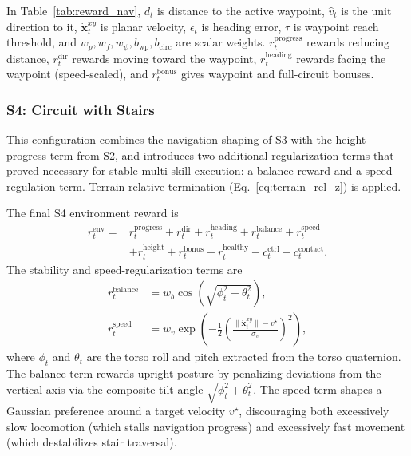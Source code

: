 \documentclass[conference]{IEEEtran}
\begin{document}
In Table~\ref{tab:reward_nav}, $d_t$ is distance to the active waypoint, $\hat{v}_t$ is the unit direction to it, $\dot{\mathbf{x}}^{xy}_t$ is planar velocity, $\epsilon_t$ is heading error, $\tau$ is waypoint reach threshold, and $w_p,w_f,w_\psi,b_{\mathrm{wp}},b_{\mathrm{circ}}$ are scalar weights. $r_t^{\mathrm{progress}}$ rewards reducing distance, $r_t^{\mathrm{dir}}$ rewards moving toward the waypoint, $r_t^{\mathrm{heading}}$ rewards facing the waypoint (speed-scaled), and $r_t^{\mathrm{bonus}}$ gives waypoint and full-circuit bonuses.



\subsubsection{S4: Circuit with Stairs}

This configuration combines the navigation shaping of S3 with the height-progress term from S2, and introduces two additional regularization terms that proved necessary for stable multi-skill execution: a balance reward and a speed-regulation term. Terrain-relative termination (Eq.~\ref{eq:terrain_rel_z}) is applied.

The final S4 environment reward is
\begin{equation}
\label{eq:s4_reward}
\begin{aligned}
r_t^{\mathrm{env}} ={}& r_t^{\mathrm{progress}} + r_t^{\mathrm{dir}} + r_t^{\mathrm{heading}} + r_t^{\mathrm{balance}} + r_t^{\mathrm{speed}} \\
& + r_t^{\mathrm{height}} + r_t^{\mathrm{bonus}} + r_t^{\mathrm{healthy}} - c_t^{\mathrm{ctrl}} - c_t^{\mathrm{contact}}.
\end{aligned}
\end{equation}
The stability and speed-regularization terms are
\begin{equation}
\label{eq:s4_balance_speed}
\begin{aligned}
r_t^{\mathrm{balance}} &= w_b \cos\!\left(\sqrt{\phi_t^2 + \theta_t^2}\right), \\
r_t^{\mathrm{speed}} &= w_v \exp\!\left(-\frac{1}{2}\left(\frac{\|\dot{\mathbf{x}}_t^{xy}\| - v^\star}{\sigma_v}\right)^2\right),
\end{aligned}
\end{equation}
where $\phi_t$ and $\theta_t$ are the torso roll and pitch extracted from the torso quaternion. The balance term rewards upright posture by penalizing deviations from the vertical axis via the composite tilt angle $\sqrt{\phi_t^2 + \theta_t^2}$. The speed term shapes a Gaussian preference around a target velocity $v^\star$, discouraging both excessively slow locomotion (which stalls navigation progress) and excessively fast movement (which destabilizes stair traversal).
\end{document}
